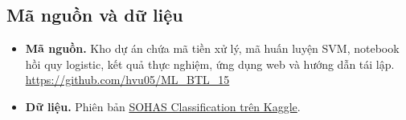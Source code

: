\subsection{Mã nguồn và dữ liệu}

\begin{itemize}
  \item \textbf{Mã nguồn.} Kho dự án chứa mã tiền xử lý, mã huấn luyện SVM, notebook hồi quy logistic, kết quả thực nghiệm, ứng dụng web và hướng dẫn tái lập. \url{https://github.com/hvu05/ML_BTL_15}
  \item \textbf{Dữ liệu.} Phiên bản \href{https://www.kaggle.com/datasets/natansantosmoura/sohas-classification}{SOHAS Classification trên Kaggle}.
\end{itemize}
